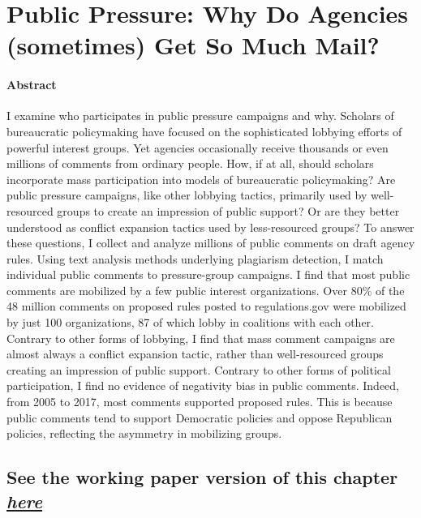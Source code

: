 \documentclass[
]{book}
\begin{document}
\hypertarget{public-pressure-why-do-agencies-sometimes-get-so-much-mail}{%
\chapter{Public Pressure: Why Do Agencies (sometimes) Get So Much Mail?}\label{public-pressure-why-do-agencies-sometimes-get-so-much-mail}}

\hypertarget{abstract-1}{%
\subsubsection*{Abstract}\label{abstract-1}}

I examine who participates in public pressure campaigns and why. Scholars of bureaucratic policymaking have focused on the sophisticated lobbying efforts of powerful interest groups. Yet agencies occasionally receive thousands or even millions of comments from ordinary people. How, if at all, should scholars incorporate mass participation into models of bureaucratic policymaking? Are public pressure campaigns, like other lobbying tactics, primarily used by well-resourced groups to create an impression of public support? Or are they better understood as conflict expansion tactics used by less-resourced groups? To answer these questions, I collect and analyze millions of public comments on draft agency rules. Using text analysis methods underlying plagiarism detection, I match individual public comments to pressure-group campaigns. I find that most public comments are mobilized by a few public interest organizations. Over 80\% of the 48 million comments on proposed rules posted to regulations.gov were mobilized by just 100 organizations, 87 of which lobby in coalitions with each other. Contrary to other forms of lobbying, I find that mass comment campaigns are almost always a conflict expansion tactic, rather than well-resourced groups creating an impression of public support. Contrary to other forms of political participation, I find no evidence of negativity bias in public comments. Indeed, from 2005 to 2017, most comments supported proposed rules. This is because public comments tend to support Democratic policies and oppose Republican policies, reflecting the asymmetry in mobilizing groups.

\hypertarget{see-the-working-paper-version-of-this-chapter-here-1}{%
\section{\texorpdfstring{See the working paper version of this chapter \href{https://judgelord.github.io/research/whymail/}{\emph{here}}}{See the working paper version of this chapter here}}\label{see-the-working-paper-version-of-this-chapter-here-1}}
\end{document}

